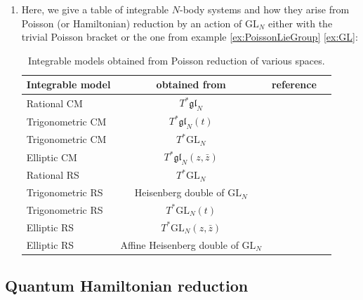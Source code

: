 \begin{example}
\begin{enumerate}[label=(\roman*)]
	\begin{equation}
		H_\text{red} = p_r^2 + \frac{\eta^2}{r^2}.
	\end{equation}
	This phase space and Hamiltonian define the rational Calogero--Moser model of two particles on a line in the center-of-mass frame. In this interpretation, $r$ is the relative separation between the particles, which is always positive, since the first particle cannot overtake the other.
		\item Here, we give a table of integrable $N$-body systems and how they arise from Poisson (or Hamiltonian) reduction by an action of $\mathrm{GL}_N$ either with the trivial Poisson bracket or the one from example \ref{ex:PoissonLieGroup} \ref{ex:GL}:
	\begin{table}[H]
	\centering
	\begin{tabular}{|l|c|c|c|}
		\hline
		Integrable model & obtained from & reference \\
		\hline
		Rational CM & $T^* \mathfrak{gl}_N$ & \cite{kazhdan_hamiltonian_1978} \\
		Trigonometric CM & $T^* \mathfrak{gl}_N(t)$ & \cite{gorsky_hamiltonian_1994} \\
		Trigonometric CM & $T^* \mathrm{GL}_N$ & \cite{kazhdan_hamiltonian_1978} \\
		Elliptic CM & $T^* \mathfrak{gl}_N(z,\bar z)$ & \cite{gorsky_elliptic_1994} \\
		Rational RS & $T^* \mathrm{GL}_N$ & \cite{fock_duality_2000} \\
		Trigonometric RS & Heisenberg double of $\mathrm{GL}_N$ & \cite{feher_poisson-lie_2009} \\
		Trigonometric RS & $T^* \mathrm{GL}_N(t)$ & \cite{gorsky_relativistic_1995} \\
		Elliptic RS & $T^* \mathrm{GL}_N(z,\bar z)$ & \cite{arutyunov_elliptic_1997} \\
		Elliptic RS & Affine Heisenberg double of $\mathrm{GL}_N$ & \cite{arutyunov_elliptic_1997-1} \\
		\hline
\end{tabular}
	\caption[Integrable models from Poisson reduction]{Integrable models obtained from Poisson reduction of various spaces.\label{table:intSysRed}}
\end{table}
	\end{enumerate}
\end{example}

\subsection{Quantum Hamiltonian reduction}

